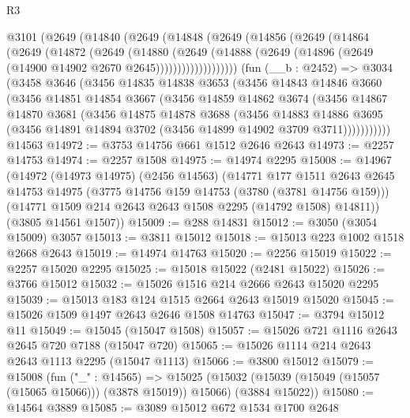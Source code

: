 \begin{lexlean}{R3}
\begin{coremodule}
    @3101
      (@2649
        (@14840
          (@2649
            (@14848
              (@2649
                (@14856
                  (@2649
                    (@14864
                      (@2649
                        (@14872
                          (@2649
                            (@14880
                              (@2649
                                (@14888
                                  (@2649
                                    (@14896 (@2649 (@14900 @14902 @2670 @2645)))))))))))))))))))
    (fun (__b : @2452) =>
    @3034
      (@3458
        @3646
        (@3456
          @14835
          @14838
          @3653
          (@3456
            @14843
            @14846
            @3660
            (@3456
              @14851
              @14854
              @3667
              (@3456
                @14859
                @14862
                @3674
                (@3456
                  @14867
                  @14870
                  @3681
                  (@3456
                    @14875
                    @14878
                    @3688
                    (@3456
                      @14883
                      @14886
                      @3695
                      (@3456 @14891 @14894 @3702 (@3456 @14899 @14902 @3709 @3711)))))))))))
    @14563
@14972 := @3753 @14756 @661 @1512 @2646 @2643
@14973 := @2257 @14753
@14974 := @2257 @1508
@14975 := @14974 @2295
@15008 := @14967
    (@14972
      (@14973 @14975)
      (@2456 @14563)
      (@14771
        @177
        @1511
        @2643
        @2645
        @14753
        @14975
        (@3775 @14756 @159 @14753 (@3780 (@3781 @14756 @159)))
        (@14771 @1509 @214 @2643 @2643 @1508 @2295 (@14792 @1508) @14811))
      (@3805 @14561 @1507))
@15009 := @288 @14831
@15012 := @3050 (@3054 @15009) @3057
@15013 := @3811 @15012
@15018 := @15013 @223 @1002 @1518 @2668 @2643
@15019 := @14974 @14763
@15020 := @2256 @15019
@15022 := @2257 @15020 @2295
@15025 := @15018 @15022 (@2481 @15022)
@15026 := @3766 @15012
@15032 := @15026 @1516 @214 @2666 @2643 @15020 @2295
@15039 := @15013 @183 @124 @1515 @2664 @2643 @15019 @15020
@15045 := @15026 @1509 @1497 @2643 @2646 @1508 @14763
@15047 := @3794 @15012 @11
@15049 := @15045 (@15047 @1508)
@15057 := @15026 @721 @1116 @2643 @2645 @720 @7188 (@15047 @720)
@15065 := @15026 @1114 @214 @2643 @2643 @1113 @2295 (@15047 @1113)
@15066 := @3800 @15012
@15079 := @15008
    (fun ("_" : @14565) =>
    @15025 (@15032 (@15039 (@15049 (@15057 (@15065 @15066))) (@3878 @15019)) @15066) (@3884 @15022))
@15080 := @14564 @3889
@15085 := @3089 @15012 @672 @1534 @1700 @2648

\end{coremodule}
\end{lexlean}
